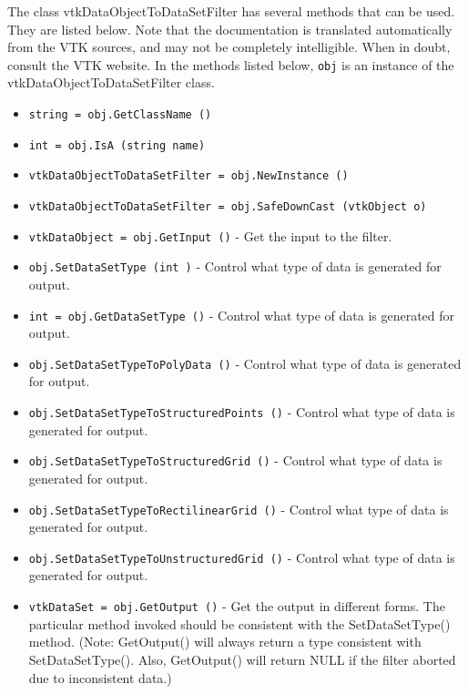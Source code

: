 The class vtkDataObjectToDataSetFilter has several methods that can be used.
  They are listed below.
Note that the documentation is translated automatically from the VTK sources,
and may not be completely intelligible.  When in doubt, consult the VTK website.
In the methods listed below, \verb|obj| is an instance of the vtkDataObjectToDataSetFilter class.
\begin{itemize}
\item  \verb|string = obj.GetClassName ()|

\item  \verb|int = obj.IsA (string name)|

\item  \verb|vtkDataObjectToDataSetFilter = obj.NewInstance ()|

\item  \verb|vtkDataObjectToDataSetFilter = obj.SafeDownCast (vtkObject o)|

\item  \verb|vtkDataObject = obj.GetInput ()| -  Get the input to the filter.

\item  \verb|obj.SetDataSetType (int )| -  Control what type of data is generated for output.

\item  \verb|int = obj.GetDataSetType ()| -  Control what type of data is generated for output.

\item  \verb|obj.SetDataSetTypeToPolyData ()| -  Control what type of data is generated for output.

\item  \verb|obj.SetDataSetTypeToStructuredPoints ()| -  Control what type of data is generated for output.

\item  \verb|obj.SetDataSetTypeToStructuredGrid ()| -  Control what type of data is generated for output.

\item  \verb|obj.SetDataSetTypeToRectilinearGrid ()| -  Control what type of data is generated for output.

\item  \verb|obj.SetDataSetTypeToUnstructuredGrid ()| -  Control what type of data is generated for output.

\item  \verb|vtkDataSet = obj.GetOutput ()| -  Get the output in different forms. The particular method invoked
 should be consistent with the SetDataSetType() method. (Note:
 GetOutput() will always return a type consistent with 
 SetDataSetType(). Also, GetOutput() will return NULL if the filter
 aborted due to inconsistent data.)


\end{itemize}
